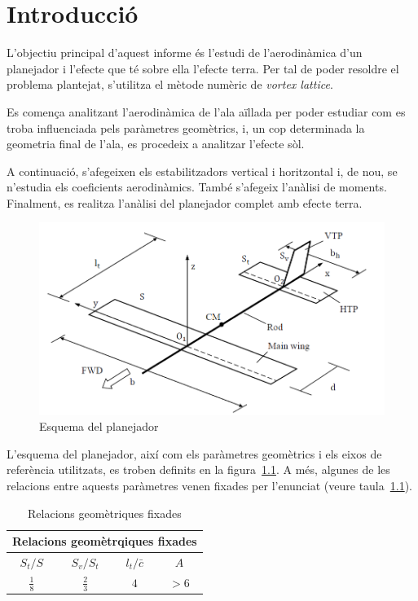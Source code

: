 \chapter{Introducció}

L'objectiu principal d'aquest informe és l'estudi de l'aerodinàmica d'un planejador i l'efecte que té sobre ella l'efecte terra. Per tal de poder resoldre el problema plantejat, s'utilitza el mètode numèric de \textit{vortex lattice}.

Es comença analitzant l'aerodinàmica de l'ala aïllada per poder estudiar com es troba influenciada pels paràmetres geomètrics, i, un cop determinada la geometria final de l'ala, es procedeix a analitzar l'efecte sòl.

A continuació, s'afegeixen els estabilitzadors vertical i horitzontal i, de nou, se n'estudia els coeficients aerodinàmics. També s'afegeix l'anàlisi de moments. Finalment, es realitza l'anàlisi del planejador complet amb efecte terra.

\begin{figure}[H]
	\centering
	\includegraphics[scale=0.5]{plots/enunciat.png}
	\caption[Esquema del planejador]{Esquema del planejador \cite{LizandraDalmases2017a}}
	\label{enunciat}
\end{figure}

L'esquema del planejador, així com els paràmetres geomètrics i els eixos de referència utilitzats, es troben definits en la figura~\ref{enunciat}. A més, algunes de les relacions entre aquests paràmetres venen fixades per l'enunciat (veure taula~\ref{tab:Dades}).

\begin{table} [H]
	\centering
	\begin{tabular}{| c | c | c | c |}	
		\hline
		\multicolumn{4}{|c|}{\bfseries Relacions geomètrqiques fixades} \\
		\hline\hline
	\textbf{$S_{t}/S$} & \textbf{$S_{v}/S_{t}$} & \textbf{$l_{t}/\bar{c}$} & \textbf{$A$}\\ \hline 
		$\frac{1}{8}$ & $\frac{2}{3}$ & $4$ & $>6$\\
		\hline	
	\end{tabular}
\caption[Relacions geomètriques fixades]{Relacions geomètriques fixades \cite{LizandraDalmases2017a}} \label{tab:Dades}
\end{table}


